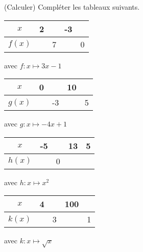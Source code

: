  (Calculer) Compléter les tableaux suivants.

\begin{multicols}{2}


    \begin{tabular}{c*{4}{|p{0.5cm}}}
        $x$     & 2 &   & -3 & \\ \hline 
        $f(x)$  &   & 7 &    & 0
    \end{tabular}
    avec $f:x\mapsto3x-1$

\vspace*{-1em}

    \begin{tabular}{c*{4}{|p{0.5cm}}}
        $x$     & 0&  & 10  & \\ \hline 
        $g(x)$  &  & -3 &  & 5
    \end{tabular}
    avec $g:x\mapsto -4x+1$


    \begin{tabular}{c*{4}{|p{0.5cm}}}
        $x$     & -5 &  & 13  & 5\\ \hline 
        $h(x)$  &  & 0  &  & 
    \end{tabular}
    avec $h:x\mapsto x^2$

\vspace*{-1em}

    \begin{tabular}{c*{4}{|p{0.5cm}}}
        $x$     & 4 &  & 100 & \\ \hline 
        $k(x)$  &  & 3 &  & 1
    \end{tabular}
    avec $k:x\mapsto \sqrt{x}$
\end{multicols}